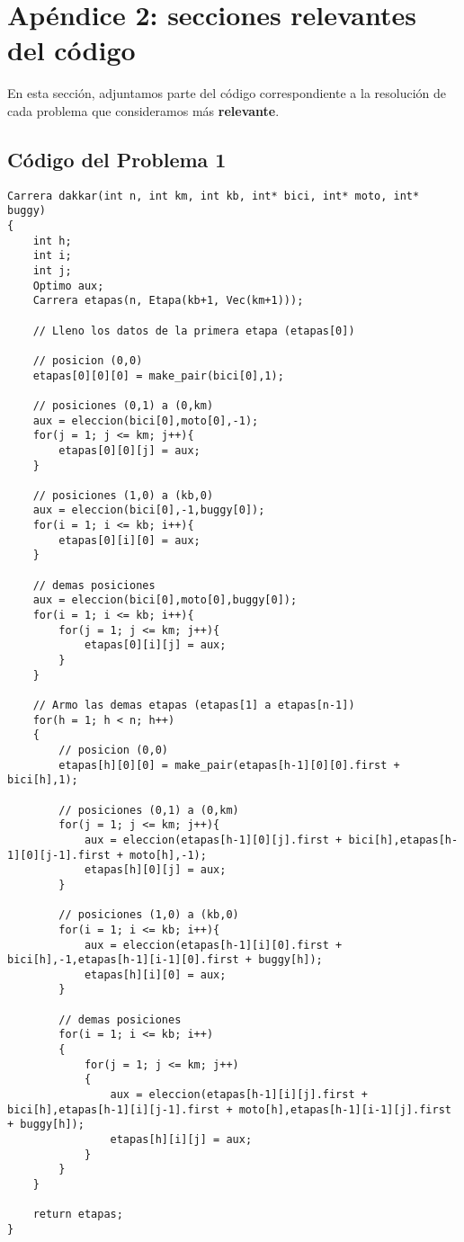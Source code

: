 \documentclass[a4paper]{article}
\begin{document}
\newpage
\section{Apéndice 2: secciones relevantes del código}
En esta sección, adjuntamos parte del código correspondiente a la resolución de cada problema que consideramos más \textbf{relevante}.

\subsection{Código del Problema 1}
\begin{lstlisting}
Carrera dakkar(int n, int km, int kb, int* bici, int* moto, int* buggy)
{
	int h;
	int i;
	int j;
	Optimo aux;
	Carrera etapas(n, Etapa(kb+1, Vec(km+1)));
	
	// Lleno los datos de la primera etapa (etapas[0])
	
	// posicion (0,0)
	etapas[0][0][0] = make_pair(bici[0],1);
	
	// posiciones (0,1) a (0,km)
	aux = eleccion(bici[0],moto[0],-1);
	for(j = 1; j <= km; j++){
		etapas[0][0][j] = aux;
	}
	
	// posiciones (1,0) a (kb,0)
	aux = eleccion(bici[0],-1,buggy[0]);
	for(i = 1; i <= kb; i++){
		etapas[0][i][0] = aux;
	}
	
	// demas posiciones
	aux = eleccion(bici[0],moto[0],buggy[0]);
	for(i = 1; i <= kb; i++){
		for(j = 1; j <= km; j++){
			etapas[0][i][j] = aux;
		}
	}
	
	// Armo las demas etapas (etapas[1] a etapas[n-1])
	for(h = 1; h < n; h++)
	{
		// posicion (0,0)
		etapas[h][0][0] = make_pair(etapas[h-1][0][0].first + bici[h],1);
		
		// posiciones (0,1) a (0,km)
		for(j = 1; j <= km; j++){
			aux = eleccion(etapas[h-1][0][j].first + bici[h],etapas[h-1][0][j-1].first + moto[h],-1);
			etapas[h][0][j] = aux;
		}
		
		// posiciones (1,0) a (kb,0)
		for(i = 1; i <= kb; i++){
			aux = eleccion(etapas[h-1][i][0].first + bici[h],-1,etapas[h-1][i-1][0].first + buggy[h]);
			etapas[h][i][0] = aux;
		}
		
		// demas posiciones
		for(i = 1; i <= kb; i++)
		{
			for(j = 1; j <= km; j++)
			{
				aux = eleccion(etapas[h-1][i][j].first + bici[h],etapas[h-1][i][j-1].first + moto[h],etapas[h-1][i-1][j].first + buggy[h]);
				etapas[h][i][j] = aux;
			}
		}
	}
	
	return etapas;
}

\end{lstlisting}
\end{document}
